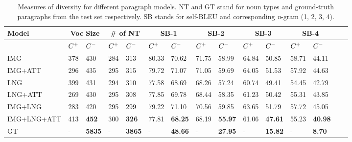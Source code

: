 \documentclass[11pt,a4paper]{article}
\begin{document}
\begin{table*}
\footnotesize
\begin{tabular}{|*{15}{l|} }
    \hline
\textbf{Model} 
            & \multicolumn{2}{c|}{\textbf{Voc Size}}
                    & \multicolumn{2}{c|}{\textbf{\# of NT}}
                            & \multicolumn{2}{c|}{\textbf{SB-1}} 
                   		 & \multicolumn{2}{c|}{\textbf{SB-2}}
                      		      & \multicolumn{2}{c|}{\textbf{SB-3}} 
                                                & \multicolumn{2}{c|}{\textbf{SB-4}}        \\
    \hline
  &   $C\sp{+}$  & $C\sp{-}$  &  $C\sp{+}$  & $C\sp{-}$ & $C\sp{+}$ & $C\sp{-}$  & $C\sp{+}$ & $C\sp{-}$  & $C\sp{+}$ & $C\sp{-}$ & $C\sp{+}$ & $C\sp{-}$  \\
    \hline
IMG  &  378  &  430 &  284  &  313  & 80.33 &  70.62  & 71.75  &  58.99  & 64.84 & 50.85 & 58.71 & 44.11  \\
    \hline
IMG+ATT   & 296 &  435  &  295 &  315 &  79.72  &  71.07  &   71.05  &  59.69  & 64.05 & 51.53 & 57.92 & 44.63 \\
    \hline
LNG   &  399  &  431  &  294 &  310 &  77.58  &  68.69 &   68.26 &  57.24  & 60.74 & 49.41 & 54.45 & 42.79 \\
    \hline
LNG+ATT   &  269 &  430 &   295 &  308  &  77.85 &   69.78  &  68.44  &  58.35  & 61.23 & 50.42 & 55.31 & 43.85  \\
    \hline    
IMG+LNG   &  283 &   420 & 295  &  299 &  79.22  &   71.10  &   70.56  &  59.85 & 63.65 & 51.79 & 57.72 & 45.05  \\
    \hline
IMG+LNG+ATT   &  413 & \textbf{452} &  300  &  \textbf{326} & 77.81 &  \textbf{68.25}  &  68.19  &  \textbf{55.97}  & 61.06 & \textbf{47.61} & 55.23 & \textbf{40.98} \\
\hline
    GT & - & \textbf{5835} & - & \textbf{3865} & - & \textbf{48.66} & - & \textbf{27.95} & - & \textbf{15.82} & - & \textbf{8.70} \\
    \hline
    \end{tabular}
        \caption{Measures of diversity for different paragraph models. NT and GT stand for noun types and ground-truth paragraphs from the test set respectively. SB stands for self-BLEU and corresponding \textit{n}-gram (1, 2, 3, 4).}
    \label{tab:divs}
\end{table*}
\end{document}
